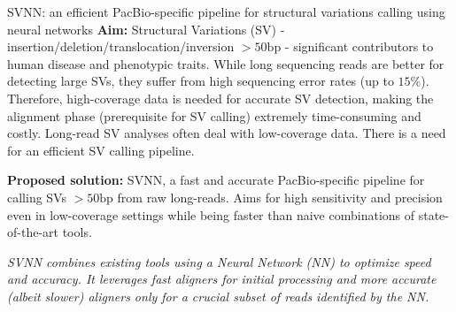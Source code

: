 \documentclass[twocolumn]{article}
\begin{document}
\begin{literaturepaper}{SVNN: an efficient PacBio-specific pipeline for structural variations calling using neural networks \cite{Akbarinejad2021}}
\label{paper-summary-2}
\small
    \textbf{Aim:} Structural Variations (SV) - insertion/deletion/translocation/inversion $> 50\text{bp}$ - significant contributors to human disease and phenotypic traits. While long sequencing reads are better for detecting large SVs, they suffer from high sequencing error rates (up to $15\%$). Therefore, high-coverage data is needed for accurate SV detection, making the alignment phase (prerequisite for SV calling) extremely time-consuming and costly. Long-read SV analyses often deal with low-coverage data. There is a need for an efficient SV calling pipeline.

    \textbf{Proposed solution:} SVNN, a fast and accurate PacBio-specific pipeline for calling SVs $> 50\text{bp}$ from raw long-reads. Aims for high sensitivity and precision even in low-coverage settings while being faster than naive combinations of state-of-the-art tools.

    \textit{SVNN combines existing tools using a Neural Network (NN) to optimize speed and accuracy. It leverages fast aligners for initial processing and more accurate (albeit slower) aligners only for a crucial subset of reads identified by the NN.}


\end{literaturepaper}
\end{document}
